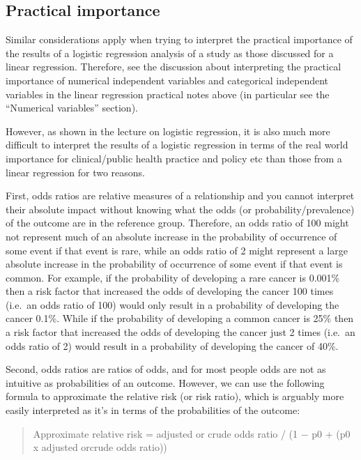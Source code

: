 \documentclass[
]{book}
\begin{document}
\hypertarget{practical-importance}{%
\subsection{Practical importance}\label{practical-importance}}

Similar considerations apply when trying to interpret the practical importance of the results of a logistic regression analysis of a study as those discussed for a linear regression. Therefore, see the discussion about interpreting the practical importance of numerical independent variables and categorical independent variables in the linear regression practical notes above (in particular see the ``Numerical variables'' section).

However, as shown in the lecture on logistic regression, it is also much more difficult to interpret the results of a logistic regression in terms of the real world importance for clinical/public health practice and policy etc than those from a linear regression for two reasons.

First, odds ratios are relative measures of a relationship and you cannot interpret their absolute impact without knowing what the odds (or probability/prevalence) of the outcome are in the reference group. Therefore, an odds ratio of 100 might not represent much of an absolute increase in the probability of occurrence of some event if that event is rare, while an odds ratio of 2 might represent a large absolute increase in the probability of occurrence of some event if that event is common. For example, if the probability of developing a rare cancer is 0.001\% then a risk factor that increased the odds of developing the cancer 100 times (i.e.~an odds ratio of 100) would only result in a probability of developing the cancer 0.1\%. While if the probability of developing a common cancer is 25\% then a risk factor that increased the odds of developing the cancer just 2 times (i.e.~an odds ratio of 2) would result in a probability of developing the cancer of 40\%.

Second, odds ratios are ratios of odds, and for most people odds are not as intuitive as probabilities of an outcome. However, we can use the following formula to approximate the relative risk (or risk ratio), which is arguably more easily interpreted as it's in terms of the probabilities of the outcome:

\begin{quote}
Approximate relative risk = adjusted or crude odds ratio / (1 − p0 + (p0 x adjusted orcrude odds ratio))
\end{quote}
\end{document}
